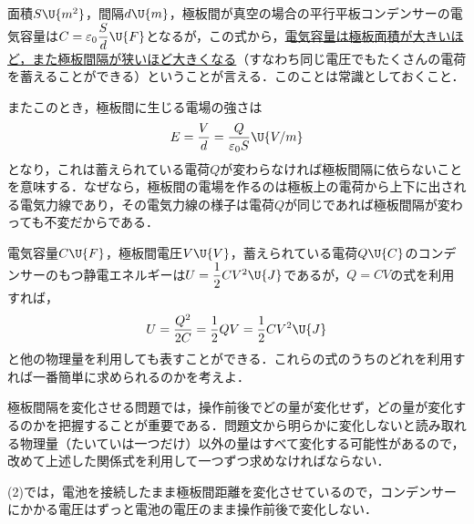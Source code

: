 \begin{multicols}{2}
\par\nopagebreak
\begin{sisin}
面積$S\U{m^2}$，間隔$d\U{m}$，極板間が真空の場合の平行平板コンデンサーの電気容量は$C=\varepsilon_0\dfrac{S}{d}\U{F}$となるが，この式から，\underline{電気容量}\hskip0pt\underline{は極板面}\hskip0pt\underline{積が大き}\hskip0pt\underline{いほど，}\hskip0pt\underline{また極板}\hskip0pt\underline{間隔が狭}\hskip0pt\underline{いほど大}\hskip0pt\underline{きくなる}（すなわち同じ電圧でもたくさんの電荷を蓄えることができる）ということが言える．このことは常識としておくこと．

またこのとき，極板間に生じる電場の強さは
\[E=\frac{V}{d}=\frac{Q}{\varepsilon_0 S}\U{V/m}\]
となり，これは{\gtfamily 蓄えられている電荷$Q$が変わらなければ極板間隔に依らない}ことを意味する．なぜなら，極板間の電場を作るのは極板上の電荷から上下に出される電気力線であり，その電気力線の様子は電荷$Q$が同じであれば極板間隔が変わっても不変だからである．

電気容量$C\U{F}$，極板間電圧$V\U{V}$，蓄えられている電荷$Q\U{C}$のコンデンサーのもつ静電エネルギーは$U=\dfrac{1}{2}CV^2\U{J}$であるが，$Q=CV$の式を利用すれば，
\[U=\frac{Q^2}{2C}=\frac{1}{2}QV=\frac{1}{2}CV^2\U{J}\]
と他の物理量を利用しても表すことができる．これらの式のうちのどれを利用すれば一番簡単に求められるのかを考えよ．

極板間隔を変化させる問題では，{\gtfamily 操作前後でどの量が変化せず，どの量が変化するのかを把握する}ことが重要である．{\gtfamily 問題文から明らかに変化しないと読み取れる物理量}（たいていは一つだけ）{\gtfamily 以外の量はすべて変化する可能性がある}ので，改めて上述した関係式を利用して一つずつ求めなければならない．

(2)では，電池を接続したまま極板間距離を変化させているので，コンデンサーにかかる電圧はずっと電池の電圧のまま操作前後で変化しない．


\end{sisin}
\end{multicols}
